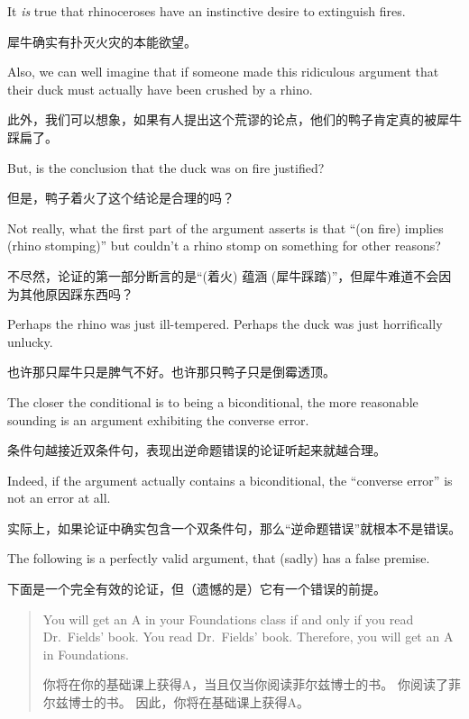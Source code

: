 It \emph{is} true that rhinoceroses have an instinctive desire to extinguish 
fires.

犀牛确实有扑灭火灾的本能欲望。

Also, we can well imagine that if someone made this ridiculous 
argument that their duck must actually have been crushed by a rhino.

此外，我们可以想象，如果有人提出这个荒谬的论点，他们的鸭子肯定真的被犀牛踩扁了。

But, 
is the conclusion that the duck was on fire justified?

但是，鸭子着火了这个结论是合理的吗？

Not really, what 
the first part of the argument asserts is that ``(on fire) implies (rhino 
stomping)'' but couldn't a rhino stomp on something for other reasons?

不尽然，论证的第一部分断言的是“(着火) 蕴涵 (犀牛踩踏)”，但犀牛难道不会因为其他原因踩东西吗？

Perhaps the rhino was just ill-tempered.  Perhaps the duck was just 
horrifically unlucky.

也许那只犀牛只是脾气不好。也许那只鸭子只是倒霉透顶。

The closer the conditional is to being a biconditional, the more reasonable 
sounding is an argument exhibiting the converse error.

条件句越接近双条件句，表现出逆命题错误的论证听起来就越合理。

Indeed, if the 
argument actually contains a biconditional, the ``converse error'' is not 
an error at all.

实际上，如果论证中确实包含一个双条件句，那么“逆命题错误”就根本不是错误。

The following is a perfectly valid argument, that (sadly) has a false premise.

下面是一个完全有效的论证，但（遗憾的是）它有一个错误的前提。
\begin{quote}
You will get an A in your Foundations class if and only if you 
read Dr.\ Fields' book.\newline
You read Dr.\ Fields' book. \newline
Therefore, you will get an A in Foundations.

你将在你的基础课上获得A，当且仅当你阅读菲尔兹博士的书。\newline
你阅读了菲尔兹博士的书。\newline
因此，你将在基础课上获得A。
\end{quote}

